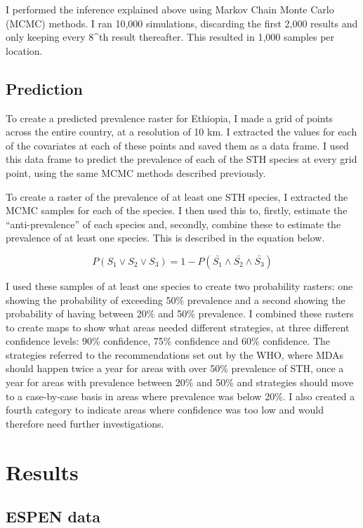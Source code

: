 \documentclass[
]{article}
\begin{document}
I performed the inference explained above using Markov Chain Monte Carlo
(MCMC) methods. I ran 10,000 simulations, discarding the first 2,000
results and only keeping every 8\^{}th result thereafter. This resulted
in 1,000 samples per location.

\hypertarget{prediction}{%
\subsection{Prediction}\label{prediction}}

To create a predicted prevalence raster for Ethiopia, I made a grid of
points across the entire country, at a resolution of 10 km. I extracted
the values for each of the covariates at each of these points and saved
them as a data frame. I used this data frame to predict the prevalence
of each of the STH species at every grid point, using the same MCMC
methods described previously.

To create a raster of the prevalence of at least one STH species, I
extracted the MCMC samples for each of the species. I then used this to,
firstly, estimate the ``anti-prevalence'' of each species and, secondly,
combine these to estimate the prevalence of at least one species. This
is described in the equation below.

\[ P(S_1 \vee S_2 \vee S_3) = 1 - P(\bar{S_1} \wedge \bar{S_2} \wedge \bar{S_3}) \]

I used these samples of at least one species to create two probability
rasters: one showing the probability of exceeding 50\% prevalence and a
second showing the probability of having between 20\% and 50\%
prevalence. I combined these rasters to create maps to show what areas
needed different strategies, at three different confidence levels: 90\%
confidence, 75\% confidence and 60\% confidence. The strategies referred
to the recommendations set out by the WHO, where MDAs should happen
twice a year for areas with over 50\% prevalence of STH, once a year for
areas with prevalence between 20\% and 50\% and strategies should move
to a case-by-case basis in areas where prevalence was below 20\%. I also
created a fourth category to indicate areas where confidence was too low
and would therefore need further investigations.

\hypertarget{results}{%
\section{Results}\label{results}}

\hypertarget{espen-data}{%
\subsection{ESPEN data}\label{espen-data}}
\end{document}

